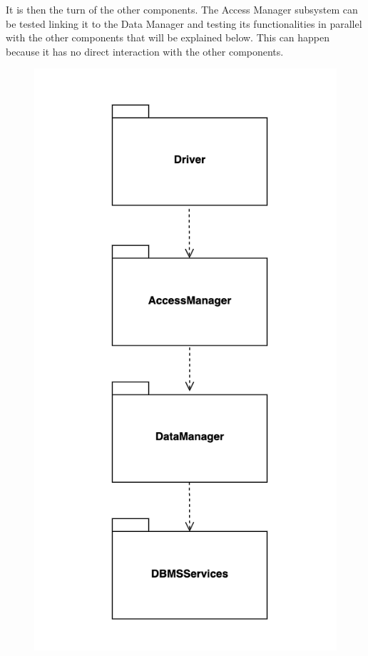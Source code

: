 \documentclass[]{article}
\begin{document}
It is then the turn of the other components. The Access Manager subsystem can be tested linking it to the Data Manager and testing its functionalities in parallel with the other components that will be explained below. This can happen because it has no direct interaction with the other components.
				\begin{figure}[H]
					\centering
					\includegraphics[scale=0.7]{Testing/Testing2.png}
					\caption{}
					\label{fig:Testing}
				\end{figure}
\end{document}
